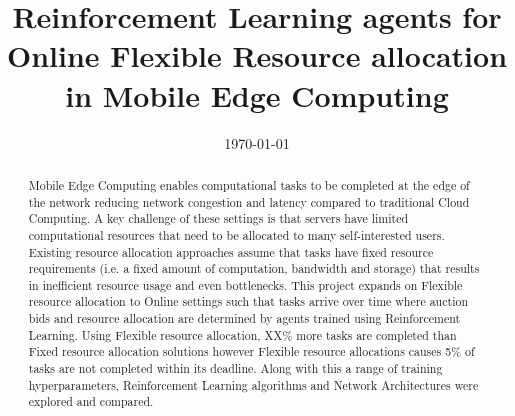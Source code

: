 \documentclass[sotoncolour]{extra/uos_project}     %
\title       {Reinforcement Learning agents for Online Flexible Resource allocation in Mobile Edge Computing}
\date       {\today}
\begin{document}
\frontmatter
\maketitle
\begin{abstract}
  Mobile Edge Computing enables computational tasks to be completed at the edge of the network reducing
  network congestion and latency compared to traditional Cloud Computing. A key challenge of these settings is that
  servers have limited computational resources that need to be allocated to many self-interested users. Existing
  resource allocation approaches assume that tasks have fixed resource requirements (i.e. a fixed amount of
  computation, bandwidth and storage) that results in inefficient resource usage and even bottlenecks.
  This project expands on Flexible resource allocation to Online settings such that tasks arrive over time where auction
  bids and resource allocation are determined by agents trained using Reinforcement Learning.
  Using Flexible resource allocation, XX\% more tasks are completed than Fixed resource allocation solutions
  however Flexible resource allocations causes 5\% of tasks are not completed within its deadline.
  Along with this a range of training hyperparameters, Reinforcement Learning algorithms and Network Architectures were
  explored and compared.
\end{abstract}

\tableofcontents
\listoffigures
\listoftables

\end{document}
